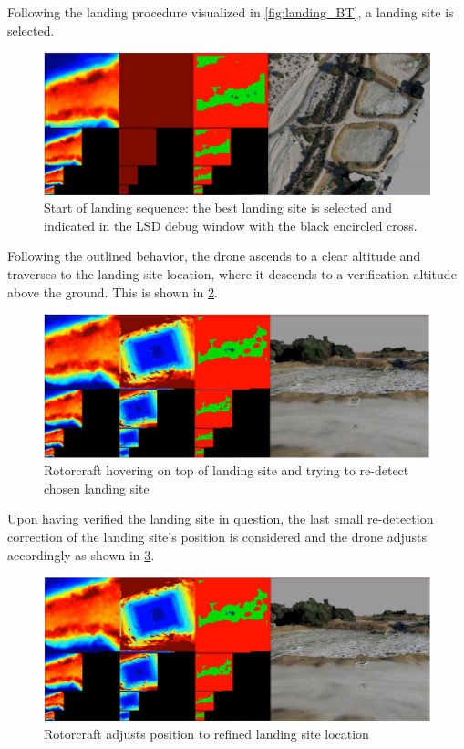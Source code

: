 Following the landing procedure visualized in \cref{fig:landing_BT}, a landing site is selected. 

\begin{figure}[h]
\centering
\includegraphics[scale=0.25]{images/autonomous_landing/demo_flight/ls_selection.png}
\caption{Start of landing sequence: the best landing site is selected and indicated in the LSD debug window with the black encircled cross.}
\label{fig:demo_ls_selection}
\end{figure}

Following the outlined behavior, the drone ascends to a clear altitude and traverses to the landing site location, where it descends to a verification altitude above the ground. This is shown in \cref{fig:demo_ver}.

\begin{figure}[h]
\centering
\includegraphics[scale=0.25]{images/autonomous_landing/demo_flight/verification.png}
\caption{Rotorcraft hovering on top of landing site and trying to re-detect chosen landing site}
\label{fig:demo_ver}
\end{figure}

Upon having verified the landing site in question, the last small re-detection correction of the landing site's position is considered and the drone adjusts accordingly as shown in \cref{fig:demo_last_correction}.

\begin{figure}[h]
\centering
\includegraphics[scale=0.25]{images/autonomous_landing/demo_flight/last_correction.png}
\caption{Rotorcraft adjusts position to refined landing site location}
\label{fig:demo_last_correction}
\end{figure}

